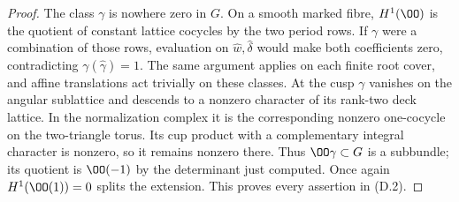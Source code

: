 \begin{proof}
The class $\gamma$ is nowhere zero in $G$. On a smooth marked fibre,
$H^1(\OO)$ is the quotient of constant lattice cocycles by the two
period rows. If $\gamma$ were a combination of those rows, evaluation
on $\widehat w,\widehat\delta$ would make both coefficients zero,
contradicting $\gamma(\widehat\gamma)=1$. The same argument applies
on each finite root cover, and affine translations act trivially on
these classes. At the cusp $\gamma$ vanishes on the angular sublattice
and descends to a nonzero character of its rank-two deck lattice.
In the normalization complex it is the corresponding nonzero
one-cocycle on the two-triangle torus. Its cup product with a complementary
integral character is nonzero, so it remains nonzero there. Thus
$\OO\gamma\subset G$ is a subbundle; its quotient is $\OO(-1)$ by
the determinant just computed. Once again $H^1(\OO(1))=0$ splits the
extension. This proves every assertion in (D.2).
\end{proof}

